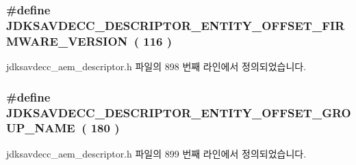 \subsubsection[{\texorpdfstring{J\+D\+K\+S\+A\+V\+D\+E\+C\+C\+\_\+\+D\+E\+S\+C\+R\+I\+P\+T\+O\+R\+\_\+\+E\+N\+T\+I\+T\+Y\+\_\+\+O\+F\+F\+S\+E\+T\+\_\+\+F\+I\+R\+M\+W\+A\+R\+E\+\_\+\+V\+E\+R\+S\+I\+ON}{JDKSAVDECC_DESCRIPTOR_ENTITY_OFFSET_FIRMWARE_VERSION}}]{\setlength{\rightskip}{0pt plus 5cm}\#define J\+D\+K\+S\+A\+V\+D\+E\+C\+C\+\_\+\+D\+E\+S\+C\+R\+I\+P\+T\+O\+R\+\_\+\+E\+N\+T\+I\+T\+Y\+\_\+\+O\+F\+F\+S\+E\+T\+\_\+\+F\+I\+R\+M\+W\+A\+R\+E\+\_\+\+V\+E\+R\+S\+I\+ON~( 116 )}\hypertarget{group__descriptor__entity_ga952791a00d09973e53f28f462fc40c57}{}\label{group__descriptor__entity_ga952791a00d09973e53f28f462fc40c57}


jdksavdecc\+\_\+aem\+\_\+descriptor.\+h 파일의 898 번째 라인에서 정의되었습니다.

\subsubsection[{\texorpdfstring{J\+D\+K\+S\+A\+V\+D\+E\+C\+C\+\_\+\+D\+E\+S\+C\+R\+I\+P\+T\+O\+R\+\_\+\+E\+N\+T\+I\+T\+Y\+\_\+\+O\+F\+F\+S\+E\+T\+\_\+\+G\+R\+O\+U\+P\+\_\+\+N\+A\+ME}{JDKSAVDECC_DESCRIPTOR_ENTITY_OFFSET_GROUP_NAME}}]{\setlength{\rightskip}{0pt plus 5cm}\#define J\+D\+K\+S\+A\+V\+D\+E\+C\+C\+\_\+\+D\+E\+S\+C\+R\+I\+P\+T\+O\+R\+\_\+\+E\+N\+T\+I\+T\+Y\+\_\+\+O\+F\+F\+S\+E\+T\+\_\+\+G\+R\+O\+U\+P\+\_\+\+N\+A\+ME~( 180 )}\hypertarget{group__descriptor__entity_gabd35e647e32849ff6288790c300ae4e7}{}\label{group__descriptor__entity_gabd35e647e32849ff6288790c300ae4e7}


jdksavdecc\+\_\+aem\+\_\+descriptor.\+h 파일의 899 번째 라인에서 정의되었습니다.

